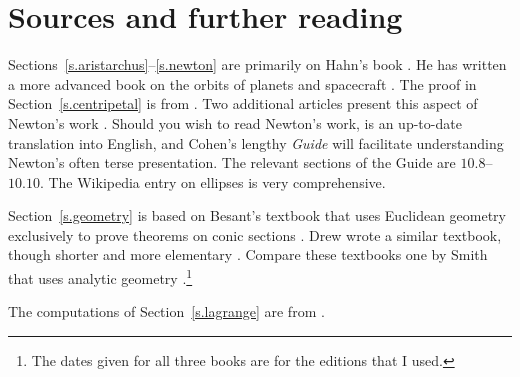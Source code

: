
\section*{Sources and further reading}


Sections~\ref{s.aristarchus}--\ref{s.newton} are primarily on Hahn's book \cite{hahn-cic}. He has written a more advanced book on the orbits of planets and spacecraft \cite{hahn-orbits}. The proof in Section~\ref{s.centripetal} is from \cite{griffiths}. Two additional articles present this aspect of Newton's work \cite{hauser-lang,stein}. Should you wish to read Newton's work, \cite{newton-cohen} is an up-to-date translation into English, and Cohen's lengthy \textit{Guide} will facilitate understanding Newton's often terse presentation. The relevant sections of the Guide are $10.8$--$10.10$. The Wikipedia entry on ellipses is very comprehensive. 

Section~\ref{s.geometry} is based on Besant's textbook that uses Euclidean geometry exclusively to prove theorems on conic sections \cite{besant}. Drew wrote a similar textbook, though shorter and more elementary \cite{drew}. Compare these textbooks one by Smith that uses analytic geometry \cite{smith}.\footnote{The dates given for all three books are for the editions that I used.}

The computations of Section~\ref{s.lagrange} are from \cite{stern}.
\begin{small}


\end{small}
